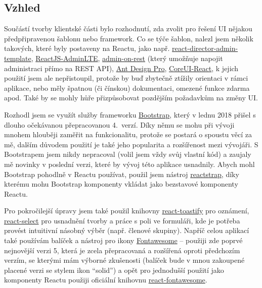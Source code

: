     \subsection{Vzhled}
    Součástí tvorby klientské části bylo rozhodnutí, zda zvolit pro řešení UI nějakou předpřipravenou šablonu nebo framework. Co se týče šablon, nalezl jsem několik takových, které byly postaveny na Reactu, jako např. \href{https://github.com/MacKentoch/react-director-admin-template}{react-director-admin-template}, \href{https://github.com/booleanhunter/ReactJS-AdminLTE}{ReactJS-AdminLTE},
    \href{https://github.com/marmelab/admin-on-rest}{admin-on-rest} (který umožňuje napojit administraci přímo na REST API),
    \href{https://github.com/ant-design/ant-design-pro/}{Ant Design Pro},
    \href{https://github.com/mrholek/CoreUI-React}{CoreUI-React}, k jejich použití jsem ale nepřistoupil, protože by buď zbytečně ztížily orientaci v rámci aplikace, nebo měly špatnou (či čínskou) dokumentaci, omezené funkce zdarma apod. Také by se mohly hůře přizpůsobovat pozdějším požadavkům na změny UI.
    
    Rozhodl jsem se využít služby frameworku \href{https://getbootstrap.com}{Bootstrap}, který v lednu 2018 přišel s dlouho očekávanou přepracovanou 4.~verzí. Díky němu se mohu při vývoji mnohem hlouběji zaměřit na funkcionalitu, protože se postará o spoustu věcí za mě, dalším důvodem použití je také jeho popularita a rozšířenost \cite{bootstrap} mezi vývojáři. S Bootstrapem jsem nikdy nepracoval (volil jsem vždy svůj vlastní kód) a zaujaly mě novinky v poslední verzi, které by vývoj této aplikace usnadnily. Abych mohl Bootstrap pohodlně v Reactu používat, použil jsem nástroj \href{https://github.com/reactstrap/reactstrap}{reactstrap}, díky kterému mohu Bootstrap komponenty vkládat jako bezstavové komponenty Reactu.
    
    Pro pokročilejší úpravy jsem také použil knihovny \href{https://github.com/fkhadra/react-toastify}{react-toastify} pro oznámení, \href{https://github.com/JedWatson/react-select}{react-select} pro usnadnění tvorby a práce s poli ve formuláři, kde je potřeba provést intuitivní násobný výběr (např. členové skupiny). Napříč celou aplikací také používám balíček a nástroj pro ikony \href{https://fontawesome.com/}{Fontawesome} -- použiji zde poprvé nejnovější verzi 5, která je zcela přepracovaná a rozšířená oproti předchozím verzím, se kterými mám výborné zkušenosti (balíček bude v mnou zakoupené placené verzi se stylem ikon \enquote{solid}) a opět pro jednodušší použití jako komponenty Reactu použiji oficiální knihovnu \href{https://github.com/FortAwesome/react-fontawesome}{react-fontawesome}.
    
